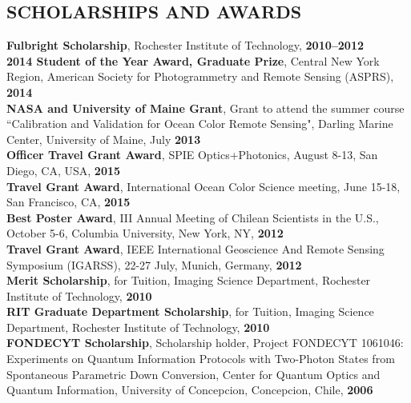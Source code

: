 \documentclass[11pt]{res}
\begin{document}
\begin{resume}
\section{SCHOLARSHIPS AND AWARDS}
\vspace{0.1in}
{\bf Fulbright Scholarship}, Rochester Institute of Technology, {\bf 2010--2012}
\vspace{0.1in}\\
{\bf {\bf 2014} Student of the Year Award, Graduate Prize}, Central New York Region, American Society for Photogrammetry and Remote Sensing (ASPRS), {\bf 2014}
\vspace{0.1in}\\
{\bf NASA and University of Maine Grant}, Grant to attend the summer course ``Calibration and Validation for Ocean Color Remote Sensing", Darling Marine Center, University of Maine, July {\bf 2013}
\vspace{0.1in}\\
{\bf Officer Travel Grant Award}, SPIE Optics+Photonics, August 8-13, San Diego, CA, USA, {\bf 2015}
\vspace{0.001in}\\
{\bf Travel Grant Award}, International Ocean Color Science meeting, June 15-18, San Francisco, CA, {\bf 2015}
\vspace{0.1in}\\
{\bf Best Poster Award}, III Annual Meeting of Chilean Scientists in the U.S., October 5-6, Columbia University, New York, NY, {\bf 2012}
\vspace{0.1in}\\
{\bf Travel Grant Award}, IEEE International Geoscience And Remote Sensing Symposium (IGARSS), 22-27 July, Munich, Germany, {\bf 2012}
\vspace{0.1in}\\
{\bf Merit Scholarship}, for Tuition, Imaging Science Department, Rochester Institute of Technology, {\bf 2010}
\vspace{0.1in}\\
{\bf RIT Graduate Department Scholarship}, for Tuition, Imaging Science Department, Rochester Institute of Technology, {\bf 2010}
\vspace{0.1in}\\
{\bf FONDECYT Scholarship}, Scholarship holder, Project FONDECYT 1061046: Experiments on Quantum Information Protocols with Two-Photon States from Spontaneous Parametric Down Conversion, Center for Quantum Optics and Quantum Information, University of Concepcion, Concepcion, Chile, {\bf 2006}\\


\end{resume}
\end{document}
